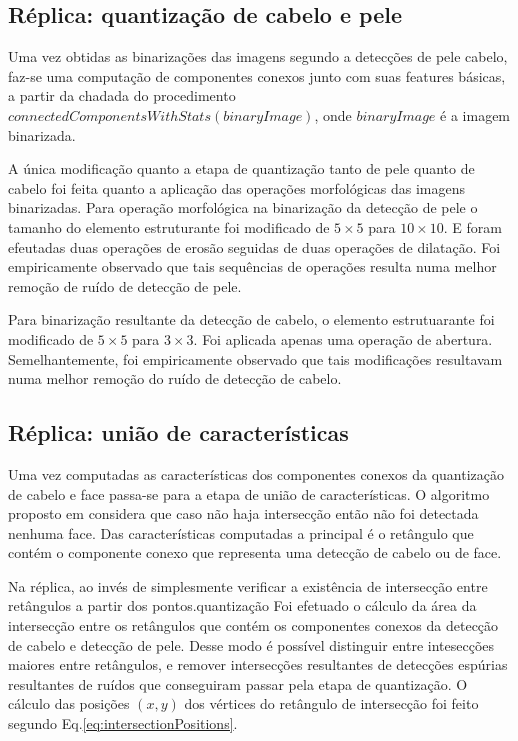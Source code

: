 \documentclass[journal,onecolumn]{IEEEtran}
\begin{document}
	\subsection{Réplica: quantização de cabelo e pele}
	
	Uma vez obtidas as binarizações das imagens segundo a detecções de pele cabelo, faz-se uma computação de componentes conexos junto com suas features básicas, a partir da chadada do procedimento $connectedComponentsWithStats(binaryImage)$, onde $binaryImage$ é a imagem binarizada.
	
	A única modificação quanto a etapa de quantização tanto de pele quanto de cabelo foi feita quanto a aplicação das operações morfológicas das imagens binarizadas.
	Para operação morfológica na binarização da detecção de pele o tamanho do elemento estruturante foi modificado de $5 \times 5$ para $10 \times 10$.
	E foram efeutadas duas operações de erosão seguidas de duas operações de dilatação. 
	Foi empiricamente observado que tais sequências de operações resulta numa melhor remoção de ruído de detecção de pele.

	Para binarização resultante da detecção de cabelo, o elemento estrutuarante foi modificado de $5 \times 5$ para $3 \times 3$.
	 Foi aplicada apenas uma operação de abertura.
	 Semelhantemente, foi empiricamente observado que tais modificações resultavam numa melhor remoção do ruído de detecção de cabelo.
	 
	 \subsection{Réplica: união de características}
	 
	Uma vez computadas as características dos componentes conexos da quantização de cabelo e face passa-se para a etapa de união de características.
	O algoritmo proposto em \cite{chen2007simple} considera que caso não haja intersecção então não foi detectada nenhuma face.
	Das características computadas a principal é o retângulo que contém o componente conexo que representa uma detecção de cabelo ou de face.
	
	Na réplica, ao invés de simplesmente verificar a existência de intersecção entre retângulos a partir dos pontos.quantização
	Foi efetuado o cálculo da área da intersecção entre os retângulos que contém os componentes conexos da detecção de cabelo e detecção de pele.
	Desse modo é possível distinguir entre intesecções maiores entre retângulos, e remover intersecções resultantes de detecções espúrias resultantes de ruídos que conseguiram passar pela etapa de quantização.
	O cálculo das posições $(x,y)$ dos vértices do retângulo de intersecção foi feito segundo Eq.\eqref{eq:intersectionPositions}.
	 
\end{document}
